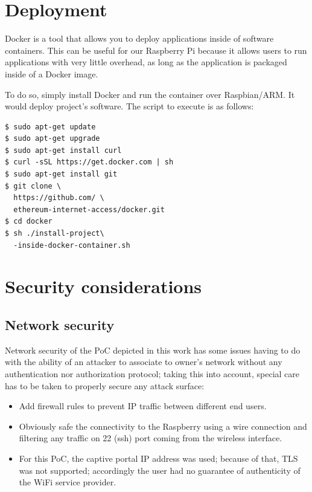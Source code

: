\documentclass[12pt]{amsart}
\begin{document}
\begin{multicols}{2}
\section{Deployment}\label{sec:deploy}

\vspace{0.35cm}

Docker is a tool that allows you to deploy applications
inside of software containers. This can be useful for our
Raspberry Pi because it allows users to run applications with
very little overhead, as long as the application
is packaged inside of a Docker image.

\vspace{0.35cm}

To do so, simply install Docker and run the container over Raspbian/ARM.
It would deploy project's software. The script to execute is as follows:

\begin{verbatim}
$ sudo apt-get update
$ sudo apt-get upgrade
$ sudo apt-get install curl
$ curl -sSL https://get.docker.com | sh
$ sudo apt-get install git
$ git clone \
  https://github.com/ \
  ethereum-internet-access/docker.git
$ cd docker
$ sh ./install-project\
  -inside-docker-container.sh
\end{verbatim}

\section{Security considerations}

\subsection{Network security}

\vspace{0.35cm}

Network security of the PoC depicted in this work
has some issues having to do with the ability of
an attacker to associate to owner's network without
any authentication nor authorization protocol; taking
this into account, special care has to be taken to
properly secure any attack surface:

\begin{itemize}
\item Add firewall rules to prevent IP traffic between
  different end users.
\item Obviously safe the connectivity to the Raspberry
  using a wire connection and filtering any traffic on 22 (ssh)
  port coming from the wireless interface.
\item For this PoC, the captive portal IP address was used; because of that,
  TLS was not supported; accordingly the user had no guarantee of
  authenticity of the WiFi service provider.
\end{itemize}


\end{multicols}
\end{document}
